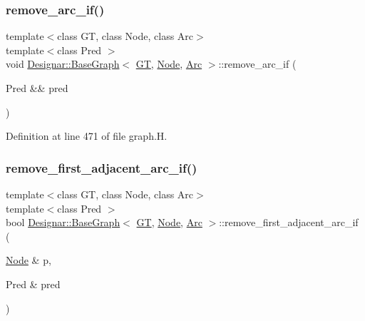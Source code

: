 \subsubsection{\texorpdfstring{remove\+\_\+arc\+\_\+if()}{remove\_arc\_if()}\hspace{0.1cm}{\footnotesize\ttfamily [2/2]}}
{\footnotesize\ttfamily template$<$class GT, class Node, class Arc$>$ \\
template$<$class Pred $>$ \\
void \hyperlink{class_designar_1_1_base_graph}{Designar\+::\+Base\+Graph}$<$ \hyperlink{demo-buildgraph_8_c_a3001c40d2c31ca87ed96cd7d1334a55e}{GT}, \hyperlink{namespace_designar_a5af326c65aa2bd26b26c410f2030d09e}{Node}, \hyperlink{namespace_designar_a3f55fb5513d62ff47cbc8f72b8e95d6f}{Arc} $>$\+::remove\+\_\+arc\+\_\+if (\begin{DoxyParamCaption}\item[{Pred \&\&}]{pred }\end{DoxyParamCaption})\hspace{0.3cm}{\ttfamily [inline]}}



Definition at line 471 of file graph.\+H.

\mbox{\label{class_designar_1_1_base_graph_ab7c2c2129abb3200b854e23f34e513e8}} 
\subsubsection{\texorpdfstring{remove\+\_\+first\+\_\+adjacent\+\_\+arc\+\_\+if()}{remove\_first\_adjacent\_arc\_if()}\hspace{0.1cm}{\footnotesize\ttfamily [1/2]}}
{\footnotesize\ttfamily template$<$class GT, class Node, class Arc$>$ \\
template$<$class Pred $>$ \\
bool \hyperlink{class_designar_1_1_base_graph}{Designar\+::\+Base\+Graph}$<$ \hyperlink{demo-buildgraph_8_c_a3001c40d2c31ca87ed96cd7d1334a55e}{GT}, \hyperlink{namespace_designar_a5af326c65aa2bd26b26c410f2030d09e}{Node}, \hyperlink{namespace_designar_a3f55fb5513d62ff47cbc8f72b8e95d6f}{Arc} $>$\+::remove\+\_\+first\+\_\+adjacent\+\_\+arc\+\_\+if (\begin{DoxyParamCaption}\item[{\hyperlink{namespace_designar_a5af326c65aa2bd26b26c410f2030d09e}{Node} \&}]{p,  }\item[{Pred \&}]{pred }\end{DoxyParamCaption})\hspace{0.3cm}{\ttfamily [inline]}}



